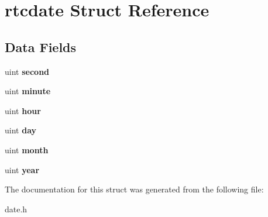 \hypertarget{structrtcdate}{}\section{rtcdate Struct Reference}
\label{structrtcdate}
\subsection*{Data Fields}
\begin{DoxyCompactItemize}
\item 
uint {\bfseries second}\hypertarget{structrtcdate_affc39128483c500d77d1a012fe045664}{}\label{structrtcdate_affc39128483c500d77d1a012fe045664}

\item 
uint {\bfseries minute}\hypertarget{structrtcdate_a5984e264f332d7634912db2716472aa7}{}\label{structrtcdate_a5984e264f332d7634912db2716472aa7}

\item 
uint {\bfseries hour}\hypertarget{structrtcdate_ac601418b8ff95c35e8fddb47dd3fc77b}{}\label{structrtcdate_ac601418b8ff95c35e8fddb47dd3fc77b}

\item 
uint {\bfseries day}\hypertarget{structrtcdate_a476a4a04d68d88b1515123aa24af8a4d}{}\label{structrtcdate_a476a4a04d68d88b1515123aa24af8a4d}

\item 
uint {\bfseries month}\hypertarget{structrtcdate_a3c509170b31d76f828681c2df54bf0b1}{}\label{structrtcdate_a3c509170b31d76f828681c2df54bf0b1}

\item 
uint {\bfseries year}\hypertarget{structrtcdate_a143aaaa0a5fcaae876c0af5f135ea5c8}{}\label{structrtcdate_a143aaaa0a5fcaae876c0af5f135ea5c8}

\end{DoxyCompactItemize}


The documentation for this struct was generated from the following file\+:\begin{DoxyCompactItemize}
\item 
date.\+h\end{DoxyCompactItemize}
